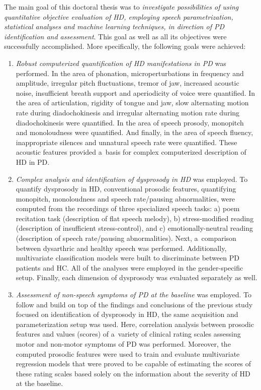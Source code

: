 The main goal of this doctoral thesis was to \textit{investigate possibilities of using quantitative objective evaluation of HD, employing speech parametrization, statistical analyses and machine learning techniques, in direction of PD identification and assessment}. This goal as well as all its objectives were successfully accomplished. More specifically, the following goals were achieved:
\begin{enumerate}
	\item \textit{Robust computerized quantification of HD manifestations in PD} was performed. In the area of phonation, microperturbations in frequency and amplitude, irregular pitch fluctuations, tremor of jaw, increased acoustic noise, insufficient breath support and aperiodicity of voice were quantified. In the area of articulation, rigidity of tongue and jaw, slow alternating motion rate during diadochokinesis and irregular alternating motion rate during diadochokinesis were quantified. In the area of speech prosody, monopitch and monoloudness were quantified. And finally, in the area of speech fluency, inappropriate silences and unnatural speech rate were quantified. These acoustic features provided a~basis for complex computerized description of HD in PD.
	\item \textit{Complex analysis and identification of dysprosody in HD} was employed. To quantify dysprosody in HD, conventional prosodic features, quantifying monopitch, monoloudness and speech rate/pausing abnormalities, were computed from the recordings of three specialized speech tasks: a) poem recitation task (description of flat speech melody), b) stress-modified reading (description of insufficient stress-control), and c) emotionally-neutral reading (description of speech rate/pausing abnormalities). Next, a~comparison between dysarthric and healthy speech was performed. Additionally, multivariate classification models were built to discriminate between PD patients and HC. All of the analyses were employed in the gender-specific setup. Finally, each dimension of dysprosody was evaluated separately as well.
	\item \textit{Assessment of non-speech symptoms of PD at the baseline} was employed. To follow and build on top of the findings and conclusions of the previous study focused on identification of dysprosody in HD, the same acquisition and parameterization setup was used. Here, correlation analysis between prosodic features and values (scores) of a~variety of clinical rating scales assessing motor and non-motor symptoms of PD was performed. Moreover, the computed prosodic features were used to train and evaluate multivariate regression models that were proved to be capable of estimating the scores of these rating scales based solely on the information about the severity of HD at the baseline.

\end{enumerate}
